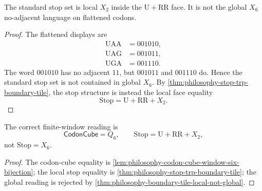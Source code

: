 \begin{theorem}
\label{thm:philosophy-boundary-tile-local-not-global}
The standard stop set is local $X_{2}$ inside the $\mathrm{U}+\mathrm{RR}$
face. It is not the global $X_{6}$ no-adjacent language on flattened
codons.
\end{theorem}
\begin{proof}
The flattened displays are
$$
\begin{aligned}
  \mathrm{UAA}&=001010,\\
  \mathrm{UAG}&=001011,\\
  \mathrm{UGA}&=001110.
\end{aligned}
$$
The word $001010$ has no adjacent $11$, but $001011$ and $001110$ do.
Hence the standard stop set is not contained in global $X_{6}$. By
\autoref{thm:philosophy-stop-trp-boundary-tile}, the stop structure is
instead the local face equality
$$
  \mathrm{Stop}=\mathrm{U}+\mathrm{RR}+X_{2}.
$$
\end{proof}

\begin{corollary}
\label{cor:philosophy-correct-window-six-reading}
The correct finite-window reading is
$$
  \mathsf{CodonCube}=Q_{6},
  \qquad
  \mathrm{Stop}=\mathrm{U}+\mathrm{RR}+X_{2},
$$
not $\mathrm{Stop}=X_{6}$.
\end{corollary}
\begin{proof}
The codon-cube equality is
\autoref{lem:philosophy-codon-cube-window-six-bijection}; the local stop
equality is \autoref{thm:philosophy-stop-trp-boundary-tile}; the global
reading is rejected by \autoref{thm:philosophy-boundary-tile-local-not-global}.
\end{proof}
